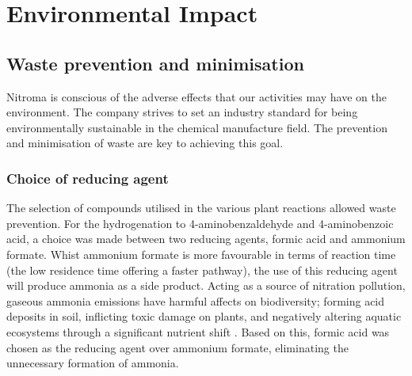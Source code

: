 \section{Environmental Impact}

\subsection{Waste prevention and minimisation}

Nitroma is conscious of the adverse effects that our activities may have on the environment. The company strives to set an industry standard for being environmentally sustainable in the chemical manufacture field. The prevention and minimisation of waste are key to achieving this goal. 

\subsubsection{Choice of reducing agent}
The selection of compounds utilised in the various plant reactions allowed waste prevention. For the hydrogenation to 4-aminobenzaldehyde and 4-aminobenzoic acid, a choice was made between two reducing agents, formic acid and ammonium formate. Whist ammonium formate is more favourable in terms of reaction time (the low residence time offering a faster pathway), the use of this reducing agent will produce ammonia as a side product. Acting as a  source of nitration pollution, gaseous ammonia emissions have harmful affects on biodiversity; forming acid deposits in soil, inflicting toxic damage on plants, and negatively altering aquatic ecosystems through a significant nutrient shift \cite{european_environment_agency_ammonia_2019}. Based on this, formic acid was chosen as the reducing agent over ammonium formate, eliminating the unnecessary formation of ammonia. 

